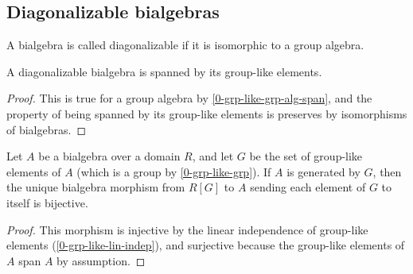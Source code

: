 \subsection{Diagonalizable bialgebras}


\begin{definition}
  \label{0-diag-bialg}
  \uses{}
  \leanok

  A bialgebra is called diagonalizable if it is isomorphic to a group algebra.
\end{definition}

\begin{lemma}
  \label{0-diag-bialg-group-like-span}
  \leanok

  A diagonalizable bialgebra is spanned by its group-like elements.
\end{lemma}
\begin{proof}
  \leanok

  This is true for a group algebra by \ref{0-grp-like-grp-alg-span}, and the
  property of being spanned by its group-like elements is preserves by
  isomorphisms of bialgebras.
\end{proof}


\begin{proposition}
  \label{0-bialg-bij-of-span-group-like}
  \leanok

  Let $A$ be a bialgebra over a domain $R$, and let $G$ be the set of group-like
  elements of $A$ (which is a group by \ref{0-grp-like-grp}). If $A$ is generated
  by $G$, then the unique bialgebra morphism from $R[G]$ to $A$ sending each
  element of $G$ to itself is bijective.
\end{proposition}
\begin{proof}
  \leanok

  This morphism is injective by the linear independence of group-like elements
  (\ref{0-grp-like-lin-indep}), and surjective because the group-like elements
  of $A$ span $A$ by assumption.
\end{proof}


